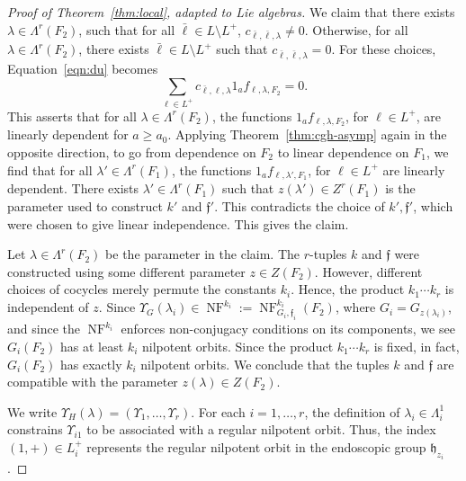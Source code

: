 \documentclass[12pt]{amsart}
\newcommand{\op}[1]{\operatorname{#1}}
\def\NF{\op{NF}}
\def\Y{\Upsilon}
\def\s{{\mathfrak{f}}}
\newcommand{\fh}{\mathfrak{h}}
\theoremstyle{plain}
\theoremstyle{definition}
\begin{document}
\begin{proof}[Proof of Theorem~\ref{thm:local}, adapted to Lie algebras]
We claim that there exists $\lambda\in \Lambda^r({F_2})$, such that
for all ${\bar\ell}\in L\setminus L^+$,
$c_{{\bar\ell},{\bar\ell},\lambda}\ne 0$.  Otherwise, for all
$\lambda\in \Lambda^r(F_2)$, there exists ${\bar\ell}\in L\setminus
L^+$ such that $c_{{\bar\ell},{\bar\ell},\lambda}=0$.  For these
choices, Equation~\ref{eqn:du} becomes
\begin{equation}\label{eqn:du2}
\sum_{\ell\in L^+} c_{{\bar\ell},\ell,\lambda}1_af_{\ell,\lambda,F_2}  = 0.
\end{equation}
This asserts that for all $\lambda\in \Lambda^r(F_2)$, the functions
$1_af_{\ell,\lambda,F_2}$, for $\ell\in L^+$, are linearly dependent
for $a\ge a_0$.  Applying Theorem~\ref{thm:cgh-asymp} again in the
opposite direction, to go from dependence on $F_2$ to linear
dependence on $F_1$, we find that for all $\lambda'\in
\Lambda^r(F_1)$, the functions $1_af_{\ell,\lambda',F_1}$, for
$\ell\in L^+$ are linearly dependent.  There exists
$\lambda'\in\Lambda^r(F_1)$ such that $z(\lambda')\in Z^r(F_1)$ is the
parameter used to construct $k'$ and $\s'$.  This contradicts the
choice of $k',\s'$, which were chosen to give linear independence.
This gives the claim.

Let $\lambda\in \Lambda^r(F_2)$ be the parameter in the claim.  The
$r$-tuples $k$ and $\s$ were constructed using some different
parameter $z\in Z(F_2)$.  However, different choices of cocycles
merely permute the constants $k_i$.  Hence, the product $k_1\cdots
k_r$ is independent of $z$.  Since $\Y_G(\lambda_i)\in
\NF^{k_i}:=\NF^{k_i}_{G_i,\s_i}(F_2)$, where $G_i = G_{z(\lambda_i)}$,
and since the $\NF^{k_i}$ enforces non-conjugacy conditions on its
components, we see $G_i(F_2)$ has at least $k_i$ nilpotent orbits.
Since the product $k_1\cdots k_r$ is fixed, in fact, $G_i(F_2)$ has
exactly $k_i$ nilpotent orbits.  We conclude that the tuples $k$ and
$\s$ are compatible with the parameter $z(\lambda)\in Z(F_2)$.

We write $\Y_H(\lambda)=(\Y_1,\ldots,\Y_r)$.  For each $i=1,\ldots,r$,
the definition of $\lambda_i\in\Lambda^1_i$ constrains $\Y_{i1}$ to be
associated with a regular nilpotent orbit.  Thus, the index $(1,+)\in
L^+_i$ represents the regular nilpotent orbit in the endoscopic group
$\fh_{z_i}$.


\end{proof}
\end{document}
